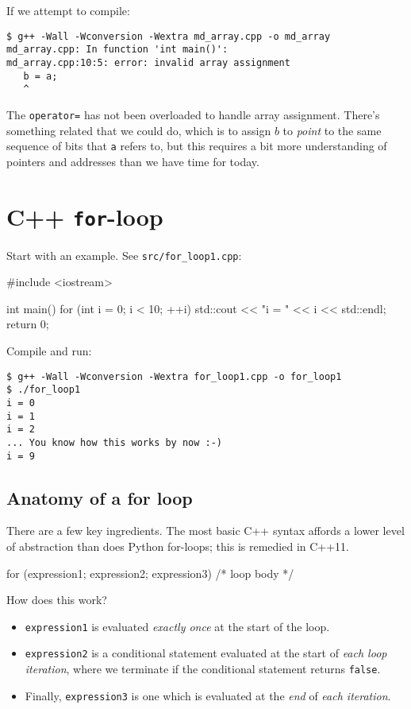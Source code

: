 \documentclass[12pt,letterpaper,twoside]{article}
\begin{document}
If we attempt to compile:
{\footnotesize
\begin{verbatim}
$ g++ -Wall -Wconversion -Wextra md_array.cpp -o md_array
md_array.cpp: In function 'int main()':
md_array.cpp:10:5: error: invalid array assignment
   b = a;
   ^
\end{verbatim}
}
The \texttt{operator=} has not been overloaded to handle array
assignment. There's something related that we could do, which is to
assign $b$ to \emph{point} to the same sequence of bits that
\texttt{a} refers to, but this requires a bit more understanding of
pointers and addresses than we have time for today.

\section{C++ \texttt{for}-loop}
Start with an example. See \texttt{src/for\_loop1.cpp}:

\begin{cpp}
#include <iostream>

int main() {
  for (int i = 0; i < 10; ++i) {
    std::cout << "i = " << i << std::endl;
  }
  return 0;
}
\end{cpp}

Compile and run:

\begin{verbatim}
$ g++ -Wall -Wconversion -Wextra for_loop1.cpp -o for_loop1
$ ./for_loop1
i = 0
i = 1
i = 2
... You know how this works by now :-)
i = 9
\end{verbatim}

\subsection{Anatomy of a for loop} There are a few key
ingredients. The most basic C++ syntax affords a lower level of
abstraction than does Python for-loops; this is remedied in C++11. 
\begin{cpp}
for (expression1; expression2; expression3) { /* loop body */ }
\end{cpp}

How does this work?
\begin{itemize}
  \item \texttt{expression1} is evaluated \emph{exactly
  once} at the start of the loop.
\item \texttt{expression2} is a conditional statement evaluated at the start of
\emph{each loop iteration}, where we terminate if the conditional statement returns \texttt{false}.
\item Finally, \texttt{expression3} is one which is evaluated at the
  \emph{end} of \emph{each iteration}.
  \end{itemize}
\end{document}
